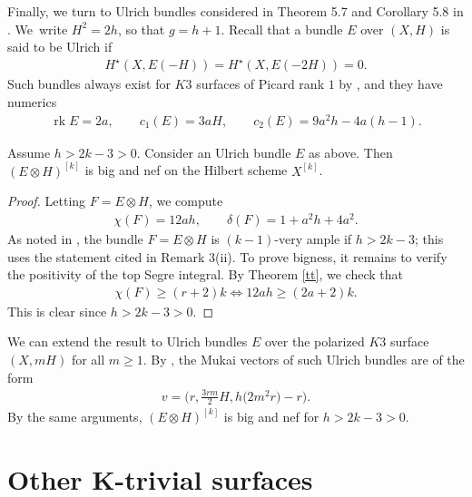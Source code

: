 \documentclass[10pt,a4paper]{amsart}
\numberwithin{equation}{section}
\newcommand{\rk}{\operatorname{rk}}
\begin{document}
Finally, we turn to Ulrich bundles considered in Theorem 5.7 and Corollary 5.8 in \cite{BBF}. We~write $H^2=2h$, so that $g=h+1$. Recall that a bundle $E$ over $(X, H)$ is said to be Ulrich if
\begin{gather*}
H^{\star}(X, E(-H))=H^\star(X, E(-2H))=0.
\end{gather*}
Such bundles always exist for $K3$ surfaces of Picard rank $1$ by \cite[Theorem 1.5]{AFO}, and they have numerics
\begin{gather*}
\rk E=2a, \qquad c_1(E)=3aH,\qquad c_2(E)=9a^2h-4a(h-1).
\end{gather*}

\begin{Example}%
Assume $h>2k-3>0$. Consider an Ulrich bundle $E$ as above. Then $(E\otimes H)^{[k]}$ is big and nef on the Hilbert scheme $X^{[k]}$.
\end{Example}

\begin{proof} Letting $F=E\otimes H$, we compute
\begin{gather*}
\chi(F)=12ah, \qquad \delta(F)=1+a^2h+4a^2.
\end{gather*}
As noted in \cite[Theorem 5.6]{BBF}, the bundle $F=E\otimes H$ is $(k-1)$-very ample if $h>2k-3$; this uses the statement cited in Remark 3(ii). To prove bigness, it remains to verify the positivity of the top Segre integral. By Theorem \ref{tt}, we check that
\begin{gather*}
\chi(F)\geq (r+2)k\iff 12ah\geq (2a+2)k.
\end{gather*}
This is clear since $h> 2k-3>0$.
\end{proof}


\begin{Example}
We can extend the result to Ulrich bundles $E$ over the polarized $K3$ surface $(X, mH)$ for all $m\geq 1$. By \cite[Proposition 4.4]{CNY}, the Mukai vectors of such Ulrich bundles are of the form
\begin{gather*}
v=\biggl(r, \frac{3rm}{2}H, h\big(2m^2r\big)-r\biggr).
\end{gather*}
By the same arguments, $(E\otimes H)^{[k]}$ is big and nef for $h>2k-3>0$.
\end{Example}

\section[Other K-trivial surfaces]
{Other $\boldsymbol K$-trivial surfaces} \label{secktriv}
\end{document}
